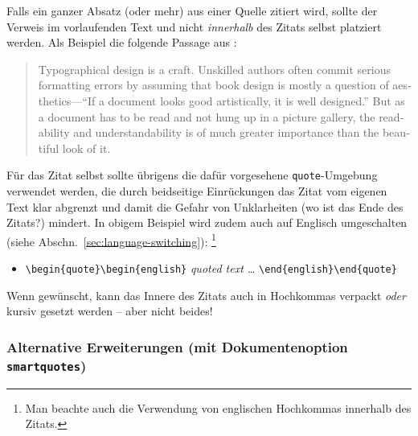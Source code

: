 Falls ein ganzer Absatz (oder mehr) aus einer Quelle zitiert wird, sollte der
Verweis im vorlaufenden Text und nicht \emph{innerhalb} des Zitats selbst
platziert werden. Als Beispiel die folgende Passage aus \cite{Oetiker2021}:
%
\begin{quote}
    \begin{english}
        Typographical design is a craft. Unskilled authors often
        commit serious formatting errors by assuming that book
        design is mostly a question of aesthetics---``If a document
        looks good artistically, it is well designed.'' But as a
        document has to be read and not hung up in a picture
        gallery, the readability and understandability is of much
        greater importance than the beautiful look of it.
    \end{english}
\end{quote}
%
Für das Zitat selbst sollte übrigens die dafür vorgesehene
\texttt{quote}-Umgebung verwendet werden, die durch beidseitige Einrückungen
das Zitat vom eigenen Text klar abgrenzt und damit die Gefahr von
Unklarheiten (wo ist das Ende des Zitats?) mindert. In obigem Beispiel wird
zudem auch auf Englisch umgeschalten (siehe Abschn.\
\ref{sec:language-switching}):%
\footnote{Man beachte auch die Verwendung von englischen Hochkommas innerhalb
des Zitats.}
%
\begin{itemize}
    \item[] \verb!\begin{quote}\begin{english}! \emph{quoted text \ldots}
    \verb!\end{english}\end{quote}!
\end{itemize}
%
Wenn gewünscht, kann das Innere des Zitats auch in Hochkommas verpackt
\emph{oder} kursiv gesetzt werden -- aber nicht beides!

\subsubsection{Alternative Erweiterungen (mit Dokumentenoption
\texttt{smartquotes})}

